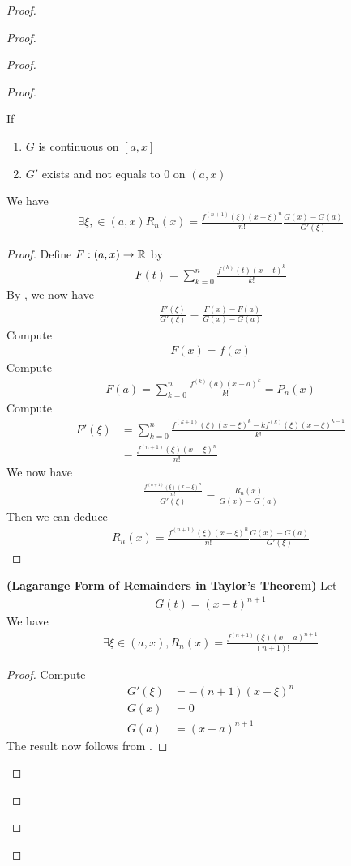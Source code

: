 \documentclass{report}
\begin{document}
\begin{proof}
\begin{proof}
\begin{proof}
\begin{proof}
\begin{theorem}
If 
\begin{enumerate}[label=(\alph*)]
  \item $G$ is continuous on  $[a,x]$ 
  \item  $G'$ exists and not equals to  $0$ on  $(a,x)$
\end{enumerate}
We have 
\begin{align*}
\exists \xi ,\in (a,x) R_n(x)=\frac{f^{(n+1)}(\xi)(x-\xi )^n}{n!}  \frac{G(x)-G(a)}{G'(\xi )}
\end{align*}
\end{theorem}
\begin{proof}
Define $F:(a,x)\to \mathbb{R}$ by 
\begin{align*}
F(t)=\sum_{k=0}^n \frac{f^{(k)}(t)(x-t)^k}{k!}
\end{align*}
By , we now have  
\begin{align*}
\frac{F'(\xi)}{G'(\xi)}=\frac{F(x)-F(a)}{G(x)-G(a)}
\end{align*}
Compute 
\begin{align*}
F(x)=f(x)
\end{align*}
Compute 
\begin{align*}
F(a)=\sum_{k=0}^n \frac{f^{(k)}(a)(x-a)^k}{k!}=P_n(x)
\end{align*}
Compute 
\begin{align*}
F'(\xi)&=\sum_{k=0}^n \frac{f^{(k+1)}(\xi)(x-\xi)^k-k f^{(k)}(\xi)(x-\xi)^{k-1}}{k!}\\
&=\frac{f^{(n+1)}(\xi)(x-\xi)^n}{n!} 
\end{align*}
We now have 
\begin{align*}
\frac{\frac{f^{(n+1)}(\xi)(x-\xi)^{n}}{n!}}{G'(\xi)}=\frac{R_n(x)}{G(x)-G(a)}
\end{align*}
Then we can deduce 
\begin{align*}
R_n(x)=\frac{f^{(n+1)}(\xi)(x-\xi)^n}{n!}\frac{G(x)-G(a)}{G'(\xi)}
\end{align*}
\end{proof}
\begin{corollary}
\label{6.5.3}
\textbf{(Lagarange Form of Remainders in Taylor's Theorem)} Let 
\begin{align*}
G(t)=(x-t)^{n+1}
\end{align*}
We have
\begin{align*}
\exists \xi \in (a,x), R_n(x)=\frac{f^{(n+1)}(\xi)(x-a)^{n+1}}{(n+1)!} 
\end{align*}
\end{corollary}
\begin{proof}
Compute 
\begin{align*}
G'(\xi)&=-(n+1)(x-\xi)^{n}\\
G(x)&=0\\
G(a)&=(x-a)^{n+1}
\end{align*}
The result now follows from . 
\end{proof}

\end{proof}
\end{proof}
\end{proof}
\end{proof}
\end{document}
